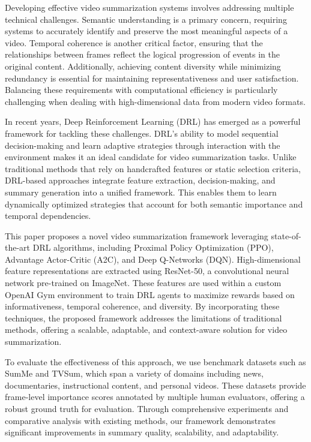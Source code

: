 \documentclass[conference]{IEEEtran}
\begin{document}
Developing effective video summarization systems involves addressing multiple technical challenges. Semantic understanding is a primary concern, requiring systems to accurately identify and preserve the most meaningful aspects of a video. Temporal coherence is another critical factor, ensuring that the relationships between frames reflect the logical progression of events in the original content. Additionally, achieving content diversity while minimizing redundancy is essential for maintaining representativeness and user satisfaction. Balancing these requirements with computational efficiency is particularly challenging when dealing with high-dimensional data from modern video formats.

In recent years, Deep Reinforcement Learning (DRL) has emerged as a powerful framework for tackling these challenges. DRL’s ability to model sequential decision-making and learn adaptive strategies through interaction with the environment makes it an ideal candidate for video summarization tasks. Unlike traditional methods that rely on handcrafted features or static selection criteria, DRL-based approaches integrate feature extraction, decision-making, and summary generation into a unified framework. This enables them to learn dynamically optimized strategies that account for both semantic importance and temporal dependencies.

This paper proposes a novel video summarization framework leveraging state-of-the-art DRL algorithms, including Proximal Policy Optimization (PPO), Advantage Actor-Critic (A2C), and Deep Q-Networks (DQN). High-dimensional feature representations are extracted using ResNet-50, a convolutional neural network pre-trained on ImageNet. These features are used within a custom OpenAI Gym environment to train DRL agents to maximize rewards based on informativeness, temporal coherence, and diversity. By incorporating these techniques, the proposed framework addresses the limitations of traditional methods, offering a scalable, adaptable, and context-aware solution for video summarization.

To evaluate the effectiveness of this approach, we use benchmark datasets such as SumMe and TVSum, which span a variety of domains including news, documentaries, instructional content, and personal videos. These datasets provide frame-level importance scores annotated by multiple human evaluators, offering a robust ground truth for evaluation. Through comprehensive experiments and comparative analysis with existing methods, our framework demonstrates significant improvements in summary quality, scalability, and adaptability.
\end{document}
